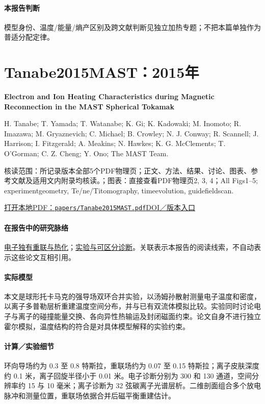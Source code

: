 \paragraph{本报告判断}模型身份、温度/能量/熵产区别及跨文献判断见独立加热专题；不把本篇单独作为普适分配定律。

\section{Tanabe2015MAST：2015年}\label{paper:Tanabe2015MAST}

\textbf{Electron and Ion Heating Characteristics during Magnetic Reconnection in the MAST Spherical Tokamak}\citep{Tanabe2015MAST}\

H. Tanabe;  T. Yamada;  T. Watanabe;  K. Gi;  K. Kadowaki;  M. Inomoto;  R. Imazawa;  M. Gryaznevich;  C. Michael;  B. Crowley;  N. J. Conway;  R. Scannell;  J. Harrison;  I. Fitzgerald;  A. Meakins;  N. Hawkes;  K. G. McClements;  T. O’Gorman;  C. Z. Cheng;  Y. Ono;  The MAST Team.

\textsf{核读范围：}所记录版本全部5个PDF物理页；正文、方法、结果、讨论、图表、参考文献及适用文内附录均核读。；\textsf{图表：}直接查看PDF物理页2, 3, 4；All Figs1–5;  experimentgeometry, Te/ne/Titomography, timeevolution, guidefieldscan.

\href{run:papers/Tanabe2015MAST.pdf}{打开本地PDF：\texttt{papers/Tanabe2015MAST.pdf}}\quad\href{https://doi.org/10.1103/PhysRevLett.115.215004}{DOI／版本入口}

\paragraph{在报告中的研究脉络}\hyperref[story:energy]{电子独有重联与热化}；\hyperref[story:diagnostic]{实验与可区分诊断}。关联表示本报告的阅读线索，不自动表示这些论文互相引用。

\paragraph{实际模型}本文是球形托卡马克的强导场双环合并实验，以汤姆孙散射测量电子温度和密度，以离子多普勒层析重建温度空间分布，并与已有双流体模拟比较。实验同时讨论电子与离子的碰撞能量交换、各向异性热输运及封闭磁面约束。论文自身不进行独立霍尔模拟，温度结构的符合是对具体模型解释的实验约束。

\paragraph{计算／实验细节}环向导场约为 0.3 至 0.8 特斯拉，重联场约为 0.07 至 0.15 特斯拉；离子皮肤深度约 0.1 米，离子回旋半径小于 0.01 米。电子诊断分别为 300 和 130 通道，空间分辨率约 15 与 10 毫米；离子诊断为 32 弦碳离子光谱层析。二维剖面组合多个放电脉冲和测量位置，重联场依据合并后磁平衡重建估计。

